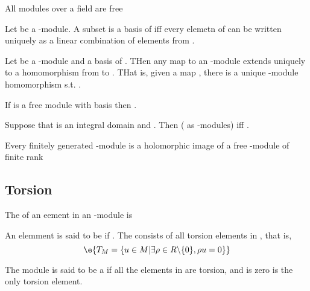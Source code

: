 \begin{Le}
\begin{A}
\begin{R} All modules over a field are free \end{R}

\begin{Le} Let  be a -module. A subset  is a basis of  iff every elemetn of  can be written uniquely as a linear combination of elements from . \end{Le}

\begin{Le} Let  be a -module and  a basis of . THen any map  to an -module  extends uniquely to a homomorphism from  to . THat is, given a map , there is a unique -module homomorphism  s.t. .
\end{Le}

\begin{Le} If  is a free module with basis  then . \end{Le}

\begin{Pp} Suppose that  is an integral domain and . Then  ( as -modules) iff . 
\end{Pp}

\begin{Pp} Every finitely generated -module is a holomorphic image of a free -module of finite rank \end{Pp}

\subsection{Torsion} 
\begin{D} The  of an eement  in an  -module is  \end{D}
\begin{D} An elemment  is said to be  if . The   consists of all torsion elements in , that is,
$$\e{T_M=\{u\in M|\exists \rho \in R\backslash \{0\},\rho u= 0\}}$$ \end{D}
\begin{D} The module  is said to be a  if all the elements in  are torsion, and  is zero is the only torsion element. \end{D}


\end{A}
\end{Le}
